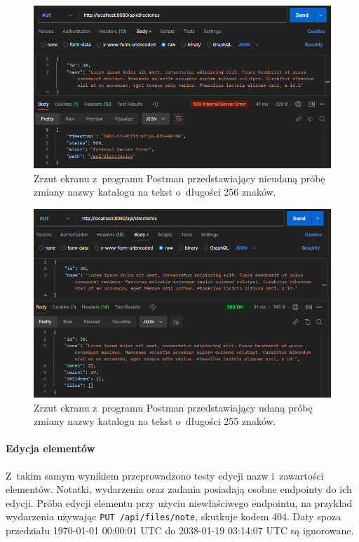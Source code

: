 \documentclass[a4paper,twoside,12pt]{book}
\begin{document}
\begin{figure}
\centering
\includegraphics[width=\textwidth]{./ChangeName256.png}
\caption{Zrzut ekranu z~programu Postman przedstawiający nieudaną próbę zmiany nazwy katalogu na tekst o~długości 256 znaków.}
\label{fig:change-name-256}
\end{figure}

\begin{figure}
\centering
\includegraphics[width=\textwidth]{./ChangeName255.png}
\caption{Zrzut ekranu z~programu Postman przedstawiający udaną próbę zmiany nazwy katalogu na tekst o~długości 255 znaków.}
\label{fig:change-name-255}
\end{figure}

\paragraph{Edycja elementów}
Z~takim samym wynikiem przeprowadzono testy edycji nazw i~zawartości elementów. Notatki, wydarzenia oraz zadania posiadają osobne endpointy do ich edycji. Próba edycji elementu przy użyciu niewłaściwego endpointu, na przykład wydarzenia używając \texttt{PUT /api/files/note}, skutkuje kodem 404. Daty spoza przedziału 1970-01-01 00:00:01 UTC do 2038-01-19 03:14:07 UTC są ignorowane.
\end{document}

